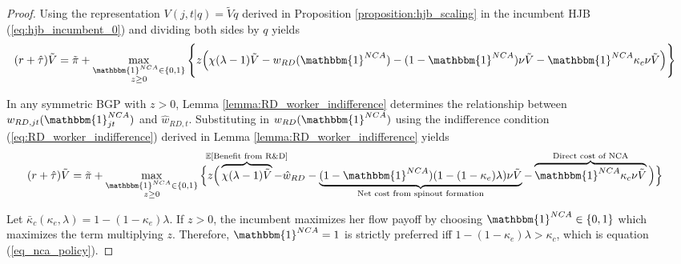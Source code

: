 \documentclass[11pt,english]{article}
\begin{document}
\begin{proof}
	Using the representation $V(j,t|q) = \tilde{V}q$ derived in Proposition \ref{proposition:hjb_scaling} in the incumbent HJB (\ref{eq:hjb_incumbent_0}) and dividing both sides by $q$ yields
	\begin{align}
	(r + \hat{\tau}) &\tilde{V} = \tilde{\pi} + \max_{\substack{\mathbbm{1}^{NCA} \in \{0,1\} \\ z \ge 0}} \Bigg\{ z \Big( \chi (\lambda -1) \tilde{V}- w_{RD}(\mathbbm{1}^{NCA}) - (1-\mathbbm{1}^{NCA}) \nu \tilde{V} - \mathbbm{1}^{NCA} \kappa_c \nu \tilde{V} \Big)\Bigg\} \label{eq:hjb_incumbent_1}
	\end{align}
	
	In any symmetric BGP with $z > 0$, Lemma \ref{lemma:RD_worker_indifference} determines the relationship between $w_{RD,jt}(\mathbbm{1}^{NCA}_{jt})$ and $\hat{w}_{RD,t}$.  Substituting in $w_{RD}(\mathbbm{1}^{NCA})$ using the indifference condition (\ref{eq:RD_worker_indifference}) derived in Lemma \ref{lemma:RD_worker_indifference} yields
	\begin{align}
	(r + \hat{\tau}) \tilde{V} &= \tilde{\pi} + \max_{\substack{\mathbbm{1}^{NCA} \in \{0,1\} \\ z \ge 0}} \Big\{z \Big( \overbrace{\chi (\lambda - 1) \tilde{V}}^{\mathclap{\mathbb{E}[\textrm{Benefit from R\&D}]}}- \hat{w}_{RD} -  \underbrace{(1-\mathbbm{1}^{NCA})(1 - (1-\kappa_{e})\lambda)\nu \tilde{V}}_{\mathclap{\text{Net cost from spinout formation}}} - \overbrace{\mathbbm{1}^{NCA} \kappa_{c} \nu \tilde{V}}^{\mathclap{\text{Direct cost of NCA}}}\Big) \Big\} \label{eq:hjb_incumbent_workerIndiff}
	\end{align}

	
	Let $\bar{\kappa}_c (\kappa_e, \lambda) = 1 - (1-\kappa_e)\lambda$. If $z > 0$, the incumbent maximizes her flow payoff by choosing $\mathbbm{1}^{NCA} \in \{0,1\}$ which maximizes the term multiplying $z$. Therefore, $\mathbbm{1}^{NCA} = 1$ is strictly preferred iff $1 - (1-\kappa_e) \lambda > \kappa_c$, which is equation (\ref{eq_nca_policy}).
\end{proof}
\end{document}
